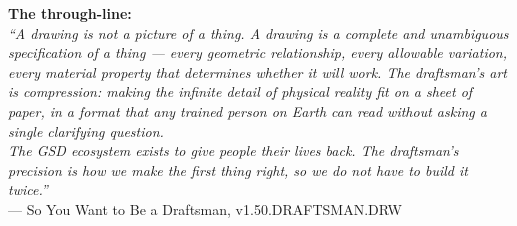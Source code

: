 \documentclass[11pt,letterpaper]{article}
\begin{document}
\begin{quotebox}
\textbf{\sffamily\large The through-line:}\\[0.5em]
{\itshape ``A drawing is not a picture of a thing. A drawing is a complete and unambiguous specification of a thing --- every geometric relationship, every allowable variation, every material property that determines whether it will work. The draftsman's art is compression: making the infinite detail of physical reality fit on a sheet of paper, in a format that any trained person on Earth can read without asking a single clarifying question.\\[0.5em]
The GSD ecosystem exists to give people their lives back. The draftsman's precision is how we make the first thing right, so we do not have to build it twice.''}\\[0.5em]
\textcolor{subtlegray}{\small --- So You Want to Be a Draftsman, v1.50.DRAFTSMAN.DRW}
\end{quotebox}
\end{document}
